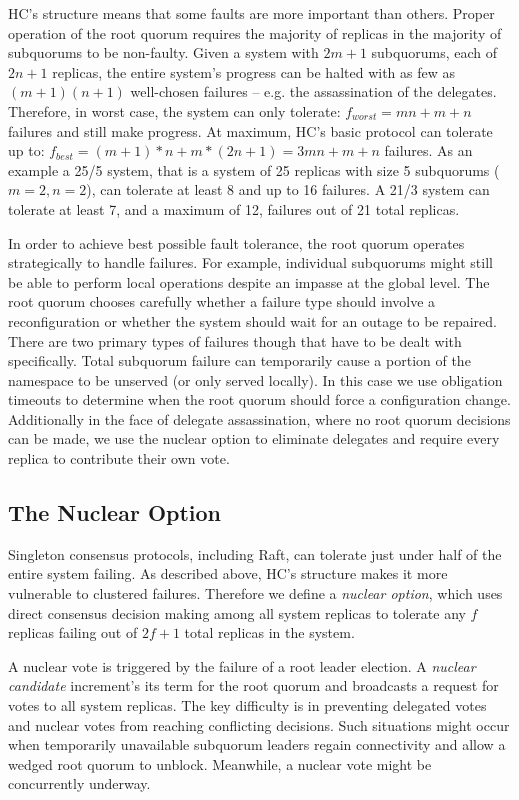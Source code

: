 HC's structure means that some faults are more important than others.
Proper operation of the root quorum requires the majority of replicas in the majority of subquorums to be non-faulty.
Given a system with $2m+1$ subquorums, each of $2n+1$ replicas, the entire system's progress can be halted with as few as $(m+1)(n+1)$ well-chosen failures -- e.g. the assassination of the delegates.
Therefore, in worst case, the system can only tolerate: $f_{worst}=mn+m+n$ failures and still make progress.
At maximum, HC's basic protocol can tolerate up to: $f_{best} = (m+1)*n + m*(2n+1) = 3mn+m+n$ failures.
As an example a 25/5 system, that is a system of 25 replicas with size 5 subquorums ($m=2, n=2$), can tolerate at least 8 and up to 16 failures.
A 21/3 system can tolerate at least 7, and a maximum of 12, failures out of 21 total replicas.

In order to achieve best possible fault tolerance, the root quorum operates strategically to handle failures.
For example, individual subquorums might still be able to perform local operations despite an impasse at the global level.
The root quorum chooses carefully whether a failure type should involve a reconfiguration or whether the system should wait for an outage to be repaired.
There are two primary types of failures though that have to be dealt with specifically.
Total subquorum failure can temporarily cause a portion of the namespace to be unserved (or only served locally).
In this case we use obligation timeouts to determine when the root quorum should force a configuration change.
Additionally in the face of delegate assassination, where no root quorum decisions can be made, we use the nuclear option to eliminate delegates and require every replica to contribute their own vote.

\subsection{The Nuclear Option}
\label{ch03_nuclear_option}

Singleton consensus protocols, including Raft, can tolerate just under half of the entire system failing.
As described above, HC's structure makes it more vulnerable to clustered failures.
Therefore we define a \emph{nuclear option}, which uses direct consensus decision making among all system replicas to tolerate any $f$ replicas failing out of $2f+1$ total replicas in the system.

A nuclear vote is triggered by the failure of a root leader election.
A \emph{nuclear candidate} increment's its term for the root quorum and broadcasts a request for votes to all system replicas.
The key difficulty is in preventing delegated votes and nuclear votes from reaching conflicting decisions.
Such situations might occur when temporarily unavailable subquorum leaders regain connectivity and allow a wedged root quorum to unblock.
Meanwhile, a nuclear vote might be concurrently underway.

